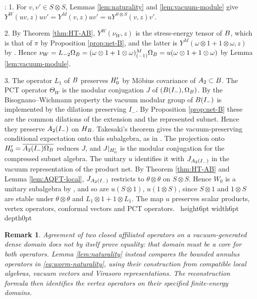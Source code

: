 \documentclass[leqno]{article}
\let\cal\relax
\newcommand{\cal}{\mathcal}
\newcommand{\qed}{\hfill \vrule height6pt  width6pt depth0pt}
\newcommand{\ot}{\otimes}
\newtheorem{remark}[thm]{Remark}
\newenvironment{proof}[1][]{\noindent {\it Proof #1} : }{\hbox{~}\qed
\smallskip
}
\numberwithin{equation}{section}
\begin{document}
\begin{proof}
1. For $v, v' \in S \ot S$, Lemmas \ref{lem:naturality} and \ref{lem:vacuum-module} give $Y^W(uv,z)uv' = Y^M(v,z)uv' = uY^{S \ot S}(v,z)v'$.

2. By Theorem \ref{thm:HT-AB}, $Y^W(\nu_W,z)$ is the stress-energy tensor of $\cal B$, which is that of $\pi$ by Proposition \ref{prop:net-B}, and the latter is $Y^M(\omega \ot 1+1 \ot \omega,z)$ by \cite[Corollary 9.6 p.~72]{HeT25}. Hence $\nu_W = L_{-2}\Omega_{\cal B} = (\omega \ot 1+1 \ot \omega)^M_{(-1)}\Omega_{\cal B} = u(\omega \ot 1+1 \ot \omega)$ by Lemma \ref{lem:vacuum-module}.

3. The operator $L_1$ of $\cal B$ preserves $\cal H'_0$ by Möbius covariance of $\cal A_2 \subset \cal B$. The PCT operator $\Theta_W$ is the modular conjugation $J$ of $(\cal B(I_-),\Omega_{\cal B})$. By the Bisognano--Wichmann property the vacuum modular group of $\cal B(I_-)$ is implemented by the dilations preserving $I_-$. By Proposition \ref{prop:net-B} these are the common dilations of the extension and the represented subnet. Hence they preserve $\cal A_2(I_-)$ on $\cal H_{\cal B}$. Takesaki's theorem gives the vacuum-preserving conditional expectation onto this subalgebra, as in \cite[Lemma 13 p.~14]{Lon03}. The projection onto $\cal H'_0=\overline{\cal A_2(I_-)\Omega_{\cal B}}$ reduces $J$, and $J|_{\cal H'_0}$ is the modular conjugation for the compressed subnet algebra. The unitary $u$ identifies it with $J_{\cal A_2(I_-)}$ in the vacuum representation of the product net. By Theorem \ref{thm:HT-AB} and Lemma \ref{lem:AQFT-local}, $J_{\cal A_2(I_-)}$ restricts to $\theta \ot \theta$ on $S \ot S$. Hence $W_0$ is a unitary subalgebra by \cite[Proposition 5.23 p.~43]{CKLW18}, and so are $u(S \ot 1)$, $u(1 \ot S)$, since $S \ot 1$ and $1 \ot S$ are stable under $\theta \ot \theta$ and $L_1 \ot 1+1 \ot L_1$. The map $u$ preserves scalar products, vertex operators, conformal vectors and PCT operators.
\end{proof}

\begin{remark}\normalfont
\label{rem:naive-uniqueness}
Agreement of two closed affiliated operators on a vacuum-generated dense domain does not by itself prove equality: that domain must be a core for both operators. Lemma \ref{lem:naturality} instead compares the bounded annulus operators in \eqref{eq:worm-naturality}, using their construction from compatible local algebras, vacuum vectors and Virasoro representations. The reconstruction formula then identifies the vertex operators on their specified finite-energy domains.
\end{remark}
\end{document}
